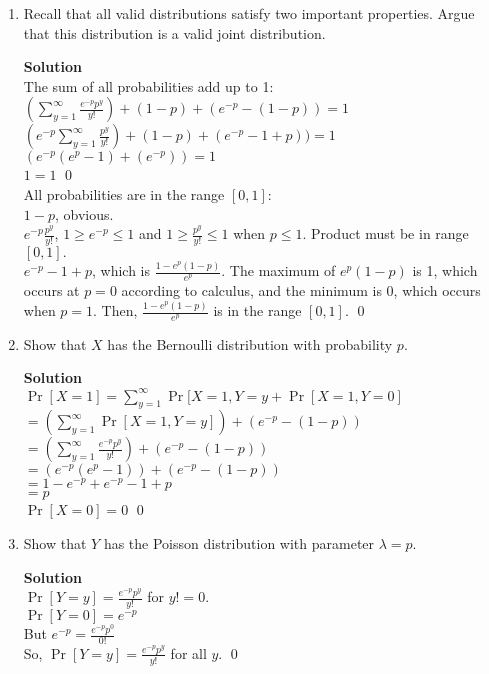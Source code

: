 \documentclass[11pt]{article}
\newenvironment{Parts}{\begin{enumerate}[label=(\alph*)]}{\end{enumerate}}
\newcommand*{\Part}{\item}
\begin{document}
\begin{Parts}
    \Part Recall that all valid distributions satisfy two important properties. Argue that this distribution is a valid joint distribution.
\begin{mdframed} \textbf{Solution} \\
The sum of all probabilities add up to 1: \\
$(\sum_{y=1}^{\infty}\frac{e^{-p}p^y}{y!}) + (1-p) + (e^{-p}-(1-p)) = 1$ \\
$(e^{-p}\sum_{y=1}^{\infty}\frac{p^y}{y!}) + (1-p) + (e^{-p}-1+p)) = 1$ \\
$(e^{-p}(e^p - 1) + (e^{-p})) = 1$ \\
$1 = 1$ \qed \\
All probabilities are in the range $[0,1]$: \\
$1-p$, obvious. \\
$e^{-p}\frac{p^y}{y!}$, $1 \geq e^{-p} \leq 1$ and $1 \geq \frac{p^y}{y!} \leq 1$ when $p \leq 1$. Product must be in range $[0,1].$ \\
$e^{-p}-1+p$, which is $\frac{1-e^p(1-p)}{e^p}$. The maximum of $e^p(1-p)$ is 1, which occurs at $p=0$ according to calculus, and the minimum is 0, which occurs when $p=1$. Then, $\frac{1-e^p(1-p)}{e^p}$ is in the range $[0,1]$. 
\qed
\end{mdframed}

    \Part Show that $X$ has the Bernoulli distribution with probability $p$.
\begin{mdframed} \textbf{Solution} \\
$\Pr[X=1]=\sum_{y=1}^{\infty}\Pr[X=1,Y=y+\Pr[X=1,Y=0]$ \\
$=(\sum_{y=1}^{\infty}\Pr[X=1, Y=y])+(e^{-p}-(1-p))$ \\
$=(\sum_{y=1}^{\infty}\frac{e^{-p}p^y}{y!})+(e^{-p}-(1-p))$ \\
$=(e^{-p}(e^p-1))+(e^{-p}-(1-p))$ \\
$=1-e^{-p}+e^{-p}-1+p$ \\
$=p$ \\
$\Pr[X=0] = 0$ \qed
\end{mdframed}

    \Part Show that $Y$ has the Poisson distribution with parameter $\lambda = p$.
\begin{mdframed} \textbf{Solution} \\
$\Pr[Y=y]=\frac{e^{-p}p^y}{y!}$ for $y!=0$. \\
$\Pr[Y=0]=e^{-p}$ \\
But $e^{-p}=\frac{e^{-p}p^0}{0!}$ \\
So, $\Pr[Y=y]=\frac{e^{-p}p^y}{y!}$ for all $y$. \qed
\end{mdframed}


\end{Parts}
\end{document}
